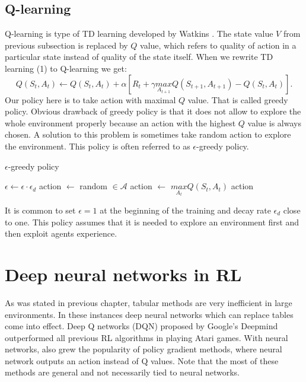 \subsection{Q-learning}
Q-learning is type of TD learning developed by Watkins \cite{watkins1992}. The state value $V$ from previous subsection is replaced by $Q$ value, which refers to quality of action in a particular state instead of quality of the state itself. When we rewrite TD learning (1) to Q-learning we get:
\begin{equation}
Q(S_t, A_t) \gets Q(S_t, A_t) + \alpha [R_{t} + \gamma \underset{A_{t+1}}{max} Q(S_{t+1}, A_{t+1}) - Q(S_t, A_t)].
\end{equation}
Our policy here is to take action with maximal $Q$ value. That is called greedy policy. Obvious drawback of greedy policy is that it does not allow to explore the whole environment properly because an action with the highest $Q$ value is always chosen. A solution to this problem is sometimes take random action to explore the environment. This policy is often referred to as $\epsilon$-greedy policy.

\begin{algorithm}
\caption{$\epsilon$-greedy policy}\label{euclid}
\begin{algorithmic}[1]
\State $\epsilon \gets \epsilon \cdot \epsilon_d$
\State action $\gets$ random $\in \mathcal{A}$
\Else 
\State action $\gets$ $\underset{A_t}{max} Q(S_t, A_t)$
\EndIf
\State \Return action
\EndProcedure
\end{algorithmic}
\end{algorithm}

It is common to set $\epsilon = 1$ at the beginning of the training and decay rate $\epsilon_d$ close to one. This policy assumes that it is needed to explore an environment first and then exploit agents experience.

\clearpage
\section{Deep neural networks in RL}
As was stated in previous chapter, tabular methods are very inefficient in large environments. In these instances deep neural networks which can replace tables come into effect. Deep Q networks (DQN) proposed by Google’s Deepmind \cite{mnih2015} outperformed all previous RL algorithms in playing Atari games. With neural networks, also grew the popularity of policy gradient methods, where neural network outputs an action instead of Q values. Note that the most of these methods are general and not necessarily tied to neural networks.

